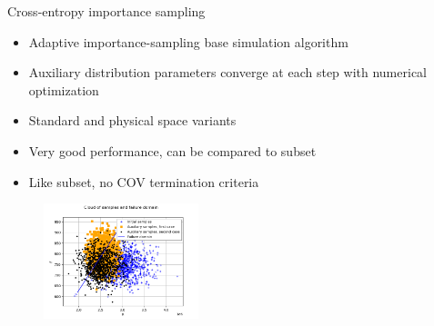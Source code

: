\documentclass[aspectratio=169]{beamer}
\begin{document}

\begin{frame}{Cross-entropy importance sampling}

\begin{itemize}
\item Adaptive importance-sampling base simulation algorithm
\item Auxiliary distribution parameters converge at each step with numerical optimization
\item Standard and physical space variants
\item Very good performance, can be compared to subset
\item Like subset, no COV termination criteria
\end{itemize}

\begin{figure}
   \includegraphics[width=0.4\textwidth]{figures/sphx_glr_plot_crossentropy_003}
\end{figure}

\end{frame}

\end{document}
